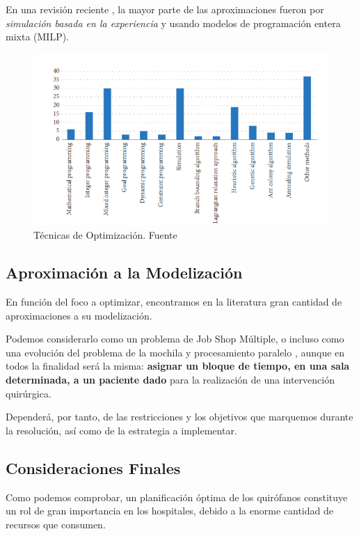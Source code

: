 En una revisión reciente \cite{Gur2018ApplicationOverview}, la mayor parte de las aproximaciones fueron por \textit{simulación basada en la experiencia} y usando modelos de programación entera mixta (MILP).


\begin{figure}
    \centering
    \includegraphics{Memoria TFG/img/graficoAlgoritmos.png}
    \caption{Técnicas de Optimización. Fuente \cite{Gur2018ApplicationOverview}}
    \label{GraficoTecnicasOpt}
\end{figure}

\subsection{Aproximación a la Modelización}

En función del foco a optimizar, encontramos en la literatura gran cantidad de aproximaciones a su modelización.

Podemos considerarlo como un problema de Job Shop Múltiple, o incluso como una evolución del problema de la mochila y procesamiento paralelo \cite{Lin2020AScheduling}, aunque en todos la finalidad será la misma: \textbf{asignar un bloque de tiempo, en una sala determinada, a un paciente dado} para la realización de una intervención quirúrgica.

Dependerá, por tanto, de las restricciones y los objetivos que marquemos durante la resolución, así como de la estrategia a implementar.

\subsection{Consideraciones Finales}

Como podemos comprobar, un planificación óptima de los quirófanos constituye un rol de gran importancia en los hospitales, debido a la enorme cantidad de recursos que consumen. 


